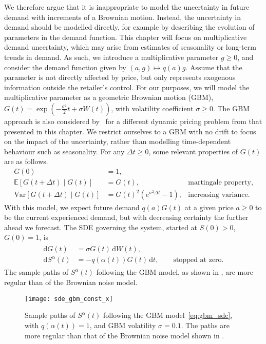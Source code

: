 \documentclass[main.tex]{subfiles}
\begin{document}
We therefore argue that it is inappropriate to model the uncertainty
in future demand with increments of a Brownian motion. Instead, the
uncertainty in demand should be modelled directly,
for example by describing the evolution of parameters in the
demand function.
This chapter will focus on multiplicative demand
uncertainty, which may arise from estimates of seasonality or
long-term trends in demand. As such, we introduce a multiplicative
parameter $g\geq 0$, and consider the demand function given by
$(a,g)\mapsto q(a)g$. Assume that the parameter is not directly
affected by price, but  only represents exogenous information outside the
retailer's control.
For our purposes, we will model the multiplicative parameter as
a geometric Brownian motion (GBM), $G(t) = \exp\left(
  -\frac{\sigma^2}{2}t +\sigma W(t)\right)$, with volatility coefficient
$\sigma\geq 0$. The GBM approach is also considered
by~\cite{xu2006monopolistic} for a different dynamic pricing problem from
that presented in this chapter.
We restrict ourselves to a GBM with no
drift to focus on the impact of the uncertainty, rather than modelling
time-dependent behaviour such as seasonality.
For any $\Delta t\geq 0$, some relevant properties of $G(t)$ are as follows.
\begin{align}
  G(0)&=1,\\
  \mathbb E[G(t+\Delta t)\mid G(t)]&=G(t),
                                   &\text{martingale property,}\\
  \mbox{Var}[G(t+\Delta t)\mid G(t)]&={G(t)}^2(e^{\sigma^2 \Delta
                                      t}-1), & \text{increasing variance.}
\end{align}
With this model, we expect future demand $q(a)G(t)$ at a given price $a\geq
0$ to be the current experienced demand, but with decreasing certainty
the further ahead we forecast.
The SDE governing the system, started at
$S(0)>0$, $G(0)=1$, is
\begin{align}
  \begin{split}\label{eq:gbm_sde}
    \mathrm{d}G(t)&=\sigma G(t)\,\mathrm{d}W(t),\\
    \mathrm{d}S^\alpha(t)&=-q(\alpha(t))G(t)\,\mathrm{d}t,\qquad\text{stopped at zero}.
  \end{split}
\end{align}
The sample paths of $S^\alpha(t)$ following the GBM model, as shown in
, are more regular
than of the Brownian noise model.
\begin{figure}[htbp]
  \centering
  \texttt{[image: sde\_gbm\_const\_x]}
  \caption{Sample paths of $S^\alpha(t)$ following the GBM
    model~\eqref{eq:gbm_sde}, with $q(\alpha(t))=1$, and GBM volatility
    $\sigma = 0.1$. The paths are  more regular than that of the
    Brownian noise model shown in .
  }\label{fig:sde_gbm_const_x}
\end{figure}
\end{document}
